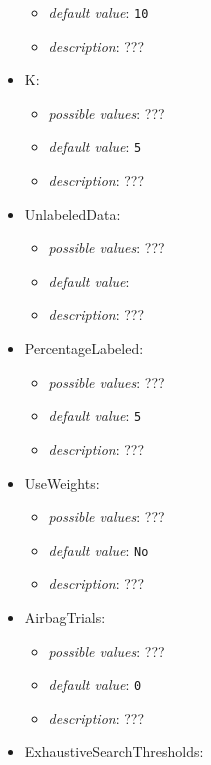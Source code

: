 \documentclass{article}
\begin{document}
\begin{itemize}
\begin{itemize}
                \item \emph{default value}: \texttt{10}
                \item \emph{description}: ???
           \end{itemize}
    \item K:
           \begin{itemize}
                \item \emph{possible values}: ???
                \item \emph{default value}: \texttt{5}
                \item \emph{description}: ???
           \end{itemize}
    \item UnlabeledData:
           \begin{itemize}
                \item \emph{possible values}: ???
                \item \emph{default value}: \texttt{}
                \item \emph{description}: ???
           \end{itemize}
    \item PercentageLabeled:
           \begin{itemize}
                \item \emph{possible values}: ???
                \item \emph{default value}: \texttt{5}
                \item \emph{description}: ???
           \end{itemize}
    \item UseWeights:
           \begin{itemize}
                \item \emph{possible values}: ???
                \item \emph{default value}: \texttt{No}
                \item \emph{description}: ???
           \end{itemize}
    \item AirbagTrials:
           \begin{itemize}
                \item \emph{possible values}: ???
                \item \emph{default value}: \texttt{0}
                \item \emph{description}: ???
           \end{itemize}
    \item ExhaustiveSearchThresholds:

\end{itemize}
\end{document}
